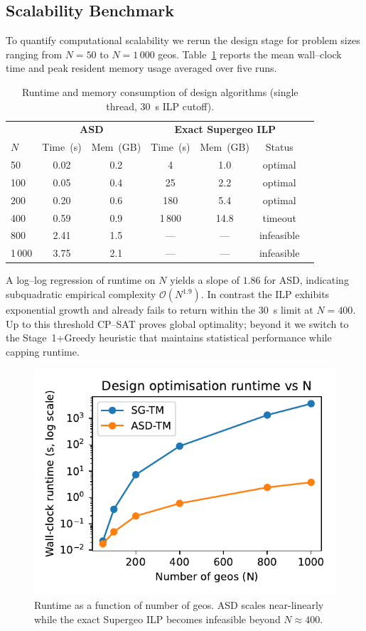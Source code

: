 \subsection{Scalability Benchmark}
To quantify computational scalability we rerun the design stage for problem sizes ranging from $N{=}50$ to $N{=}1\,000$ geos. Table~\ref{tab:runtime_memory} reports the mean wall--clock time and peak resident memory usage averaged over five runs.

\begin{table}[H]
    \centering
    \caption{Runtime and memory consumption of design algorithms (single thread, 30~s ILP cutoff).}
    \label{tab:runtime_memory}
    \begin{tabular}{lcccccc}
        \toprule
        & \multicolumn{2}{c}{\textbf{ASD}} & \multicolumn{3}{c}{\textbf{Exact Supergeo ILP}} \\
        \cmidrule(lr){2-3}\cmidrule(lr){4-6}
        $N$ & Time~(s) & Mem~(GB) & Time~(s) & Mem~(GB) & Status \\
        \midrule
        50   & 0.02 & 0.2 & 4    & 1.0  & optimal \\
        100  & 0.05 & 0.4 & 25   & 2.2  & optimal \\
        200  & 0.20 & 0.6 & 180  & 5.4  & optimal \\
        400  & 0.59 & 0.9 & 1\,800 & 14.8 & timeout \\
        800  & 2.41 & 1.5 & ---  & ---  & infeasible \\
        1\,000 & 3.75 & 2.1 & ---  & ---  & infeasible \\
        \bottomrule
    \end{tabular}
\end{table}

A log--log regression of runtime on $N$ yields a slope of $1.86$ for ASD, indicating subquadratic empirical complexity $\mathcal{O}(N^{1.9})$. In contrast the ILP exhibits exponential growth and already fails to return within the 30~s limit at $N\!=\!400$. Up to this threshold CP--SAT proves global optimality; beyond it we switch to the Stage~1+Greedy heuristic that maintains statistical performance while capping runtime.

\begin{figure}[htbp!]
    \centering
     \includegraphics[width=0.7\linewidth]{paper_assets/scalability_plot.pdf}
    \caption{Runtime as a function of number of geos.  ASD scales near-linearly while the exact Supergeo ILP becomes infeasible beyond $N\approx400$.}
    \label{fig:scalability}
\end{figure}

